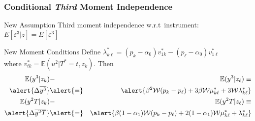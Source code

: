 \documentclass{beamer}
\begin{document}
\begin{frame}
  \frametitle{Conditional \emph{Third} Moment Independence}
  \begin{block}{New Assumption}
    Third moment independence w.r.t\ instrument: $E[\varepsilon^3|z]=E[\varepsilon^3]$
  \end{block}
  \begin{alertblock}{New Moment Conditions}
    Define $\lambda_{k\ell}^* = (p_k - \alpha_0) v_{1k}^* - (p_\ell - \alpha_0) v_{1\ell}^*$\\ where 
  $v^*_{tk} =  \mathbb{E}(u^2|T^*=t, z_k)$. Then
  \begin{eqnarray*}
    \mathbb{E}(y^3|z_k) &-& \mathbb{E}(y^3|z_\ell)  \equiv \\ \alert{\Delta\overline{y^3}} &\alert{=}& \alert{\beta^2 \mathcal{W} (p_k - p_\ell)  + 3 \beta \mathcal{W} \mu_{k\ell}^* + 3 \mathcal{W} \lambda^*_{k\ell}}\\
    \mathbb{E}(y^2T|z_k) &-& \mathbb{E}(y^2T|z_\ell) \equiv \\ \alert{\Delta\overline{y^2T}} &\alert{=}&  \alert{\beta(1-\alpha_1)\mathcal{W}(p_k - p_\ell) + 2(1-\alpha_1)\mathcal{W}\mu_{k\ell}^* + \lambda_{k\ell}^*}
  \end{eqnarray*}
  \end{alertblock}
\end{frame}
%
%
%
\end{document}
